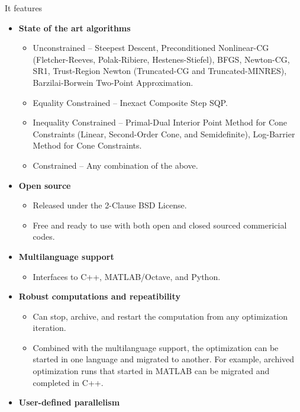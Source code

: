 \documentclass{report}
\begin{document}
\begin{center}
    \usebox{\boxOptimizationTypes}
\end{center}
\noindent It features 
\begin{itemize}
    \item {\bf State of the art algorithms}
        \begin{itemize}
            \item Unconstrained -- Steepest Descent, Preconditioned Nonlinear-CG (Fletcher-Reeves, Polak-Ribiere, Hestenes-Stiefel), BFGS, Newton-CG, SR1, Trust-Region Newton (Truncated-CG and Truncated-MINRES), Barzilai-Borwein Two-Point Approximation.
            \item Equality Constrained -- Inexact Composite Step SQP.
            \item Inequality Constrained -- Primal-Dual Interior Point Method for Cone Constraints (Linear, Second-Order Cone, and Semidefinite), Log-Barrier Method for Cone Constraints.
            \item Constrained -- Any combination of the above.
        \end{itemize}
    \item {\bf Open source}
        \begin{itemize}
            \item Released under the 2-Clause BSD License.
            \item Free and ready to use with both open and closed sourced commericial codes.
        \end{itemize}
    \item {\bf Multilanguage support}
        \begin{itemize}
            \item Interfaces to C++, MATLAB/Octave, and Python.
        \end{itemize}
    \item {\bf Robust computations and repeatibility}
        \begin{itemize}
            \item Can stop, archive, and restart the computation from any optimization iteration.
            \item Combined with the multilanguage support, the optimization can be started in one language and migrated to another.  For example, archived optimization runs that started in MATLAB can be migrated and completed in C++.
        \end{itemize}
    \item {\bf User-defined parallelism}

\end{itemize}
\end{document}

